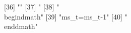  [36] ""                                                                                                                                                                                                                                                                                                                                                                                                                                                                                                                                                                                                                                             
 [37] "%
 [38] "\\begin{dmath}"                                                                                                                                                                                                                                                                                                                                                                                                                                                                                                                                                                                                                               
 [39] "{ms_{t}}={ms_{t-1}}"                                                                                                                                                                                                                                                                                                                                                                                                                                                                                                                                                                                                                          
 [40] "\\end{dmath}"                                                                                                                                                                                                                                                                                                                                                                                                                                                                                                                                                                                                                                 
